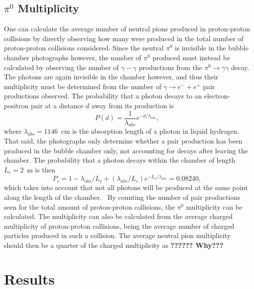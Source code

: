 \documentclass[twocolumn]{article}
\begin{document}
\subsection{$\pi^0$ Multiplicity}
One can calculate the average number of neutral pions produced in proton-proton collisions by directly observing how many were produced in the total number of proton-proton collisions considered. Since the neutral $\pi^0$ is invisible in the bubble chamber photographs however, the number of $\pi^0$ produced must instead be calculated by observing the number of $\gamma-\gamma$ productions from the $\pi^0 \to \gamma \gamma$ decay. The photons are again invisible in the chamber however, and thus their multiplicity must be determined from the number of $\gamma \to e^- + e^+$ pair productions observed. The probability that a photon decays to an electron-positron pair at a distance $d$ away from its production is~\cite{seul}
\begin{equation*}
P(d) = \frac {1} {\lambda_{abs}} e^{-d/\lambda_{abs}},
\end{equation*}
where $\lambda_{abs} = 1146$~cm is the absorption length of a photon in liquid hydrogen. That said, the photographs only determine whether a pair production has been produced in the bubble chamber only, not accounting for decays after leaving the chamber. The probability that a photon decays within the chamber of length $L_c=2$~m is then
\begin{equation} \label{eq:mult}
P_c = 1-\lambda_{abs}/L_c +  (\lambda_{abs}/L_c) e^{-L_c/\lambda_{abs}} = 0.08240,
\end{equation}
which takes into account that not all photons will be produced at the same point along the length of the chamber.~\cite{seul} By counting the number of pair productions seen for the total amount of proton-proton collisions, the $\pi^0$ multiplicity can be calculated. The multiplicity can also be calculated from the average charged multiplicity of proton-proton collisions, being the average number of charged particles produced in such a collision. The average neutral pion multiplicity should then be a quarter of the charged multiplicity as \textbf{?????? Why???}

\section{Results} \label{sec:res}
\end{document}
